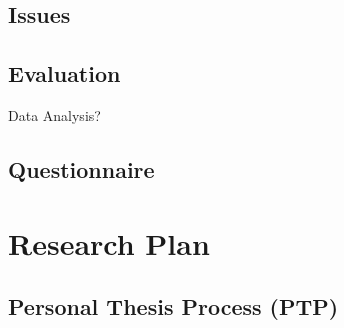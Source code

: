 \section{Issues}
\section{Evaluation}   Data Analysis?
\section{Questionnaire}

\chapter{Research Plan}
\section{Personal Thesis Process (PTP)}



